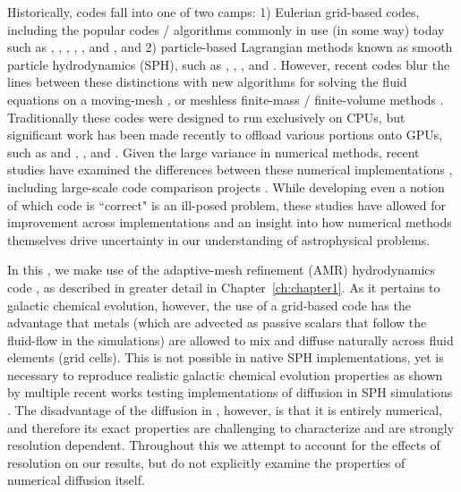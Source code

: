 Historically, codes fall into one of two camps: 1) Eulerian grid-based codes, including the popular codes / algorithms commonly in use (in some way) today such as  \citep{StoneNorman1992},  \citep{FLASH},  \citep{Teyssier2002},  \citep{Athena},  \citep{Rudd2008}, and  \citep{Enzo2014}, and 2) particle-based Lagrangian methods known as smooth particle hydrodynamics (SPH), such as  \citep{Springel2005},  \citep{Stadel2001},  \citep{Wadsley2004}, and  \citep{Menon2015}. However, recent codes blur the lines between these distinctions with new algorithms for solving the fluid equations on a moving-mesh \citep[e.g. ][]{Springel2010}, or meshless finite-mass / finite-volume methods \citep[such as those implemented in ][]{Hopkins2015}. Traditionally these codes were designed to run exclusively on CPUs, but significant work has been made recently to offload various portions onto GPUs, such as  and  \citep{Schive2010,Schive2018},  \citep{Kulikov2014}, and  \citep{Schneider2015}. Given the large variance in numerical methods, recent studies have examined the differences between these numerical implementations \citep[e.g.][]{Agertz2007}, including large-scale code comparison projects \citep[e.g.][]{AGORA,AGORA2}. While developing even a notion of which code is ``correct" is an ill-posed problem, these studies have allowed for improvement across implementations and an insight into how numerical methods themselves drive uncertainty in our understanding of astrophysical problems.

In this \dissertation, we make use of the adaptive-mesh refinement (AMR) hydrodynamics code , as described in greater detail in Chapter~\ref{ch:chapter1}. As it pertains to galactic chemical evolution, however, the use of a grid-based code has the advantage that metals (which are advected as passive scalars that follow the fluid-flow in the simulations) are allowed to mix and diffuse naturally across fluid elements (grid cells). This is not possible in native SPH implementations, yet is necessary to reproduce realistic galactic chemical evolution properties as shown by multiple recent works testing implementations of diffusion in SPH simulations \citep[e.g.][]{Shen2010,Su2017a,Escala2018}. The disadvantage of the diffusion in , however, is that it is entirely numerical, and therefore its exact properties are challenging to characterize and are strongly resolution dependent. Throughout this \dissertation we attempt to account for the effects of resolution on our results, but do not explicitly examine the properties of numerical diffusion itself.


